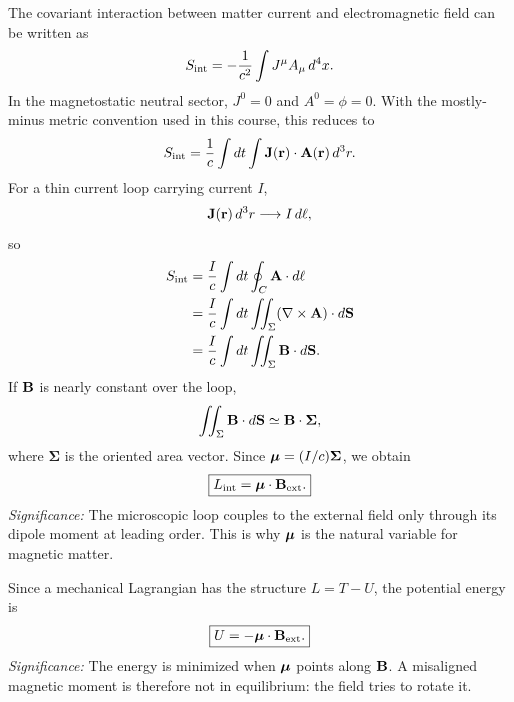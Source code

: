 The covariant interaction between matter current and electromagnetic field can be
written as
\begin{equation}\label{eq:lec16-Sint-covariant}
  S_{\rm int}
  =
  -\frac{1}{c^2}\int J^\mu A_\mu\,d^4x.
\end{equation}
In the magnetostatic neutral sector, $J^0=0$ and $A^0=\phi=0$.  With the mostly-minus
metric convention used in this course, this reduces to
\begin{equation}\label{eq:lec16-Sint-current}
  S_{\rm int}
  =
  \frac{1}{c}\int dt\int \mathbf{J}(\mathbf{r})\cdot\mathbf{A}(\mathbf{r})\,d^3r.
\end{equation}
For a thin current loop carrying current $I$,
\begin{equation}\label{eq:lec16-J-to-loop}
  \mathbf{J}(\mathbf{r})\,d^3r \longrightarrow I\,d\mathbf{\ell},
\end{equation}
so
\begin{align}
  S_{\rm int}
  &= \frac{I}{c}\int dt\oint_C \mathbf{A}\cdot d\mathbf{\ell} \notag\\
  &= \frac{I}{c}\int dt\iint_\Sigma
     (\nabla\times\mathbf{A})\cdot d\mathbf{S} \notag\\
  &= \frac{I}{c}\int dt\iint_\Sigma \mathbf{B}\cdot d\mathbf{S}. \label{eq:lec16-Sint-stokes}
\end{align}
If $\mathbf{B}$ is nearly constant over the loop,
\begin{equation}\label{eq:lec16-uniform-field-loop}
  \iint_\Sigma \mathbf{B}\cdot d\mathbf{S}
  \simeq
  \mathbf{B}\cdot\boldsymbol{\Sigma},
\end{equation}
where $\boldsymbol{\Sigma}$ is the oriented area vector.  Since
$\boldsymbol{\mu}=(I/c)\boldsymbol{\Sigma}$, we obtain
\begin{equation}\label{eq:lec16-Lint}
  \boxed{L_{\rm int}=\boldsymbol{\mu}\cdot\mathbf{B}_{\rm ext}.}
\end{equation}
\textit{Significance:} The microscopic loop couples to the external field only through
its dipole moment at leading order.  This is why $\boldsymbol{\mu}$ is the natural variable for
magnetic matter.

Since a mechanical Lagrangian has the structure $L=T-U$, the potential energy is
\begin{equation}\label{eq:lec16-U-dipole}
  \boxed{U=-\boldsymbol{\mu}\cdot\mathbf{B}_{\rm ext}.}
\end{equation}
\textit{Significance:} The energy is minimized when $\boldsymbol{\mu}$ points along $\mathbf{B}$.  A
misaligned magnetic moment is therefore not in equilibrium: the field tries to rotate it.

